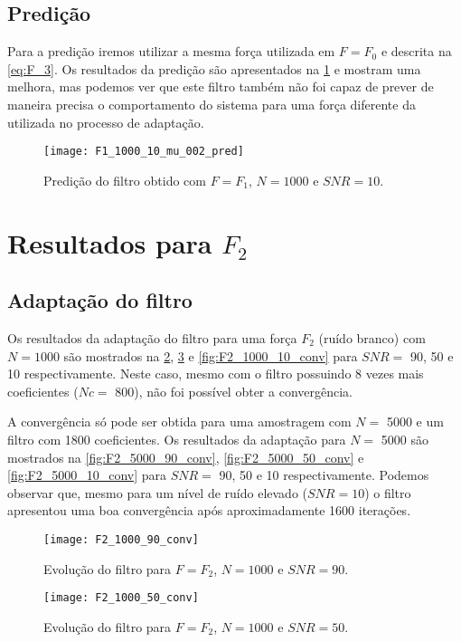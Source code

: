 \subsection{Predição}

Para a predição iremos utilizar a mesma força utilizada em $ F=F_0 $ e descrita na \ref{eq:F_3}. Os resultados da predição são apresentados na \cref{fig:F1_1000_10_mu_002_pred} e mostram uma melhora, mas podemos ver que este filtro também não foi capaz de prever de maneira precisa o comportamento do sistema para uma força diferente da utilizada no processo de adaptação.

\begin{figure}[h]
	\centering
	\texttt{[image: F1\_1000\_10\_mu\_002\_pred]}
	\caption{Predição do filtro obtido com $ F=F_1 $, $ N=1000 $ e $ SNR=10 $.}
	\label{fig:F1_1000_10_mu_002_pred}
\end{figure}

\section{Resultados para $ F_2 $}
\subsection{Adaptação do filtro}

Os resultados da adaptação do filtro para uma força $ F_2 $ (ruído branco) com $ N=1000 $ são mostrados na \cref{fig:F2_1000_90_conv}, \cref{fig:F2_1000_50_conv} e \cref{fig:F2_1000_10_conv} para $ SNR = $ 90, 50 e 10  respectivamente. Neste caso, mesmo com o filtro possuindo 8 vezes mais coeficientes ($ Nc = $ 800), não foi possível obter a convergência.

A convergência só pode ser obtida para uma amostragem com $ N= $ 5000 e um filtro com 1800 coeficientes. Os resultados da adaptação para $ N= $ 5000 são mostrados na \cref{fig:F2_5000_90_conv}, \cref{fig:F2_5000_50_conv} e \cref{fig:F2_5000_10_conv} para $ SNR = $ 90, 50 e 10  respectivamente. Podemos observar que, mesmo para um nível de ruído elevado ($ SNR=10 $) o filtro apresentou uma boa convergência após aproximadamente 1600 iterações.

\begin{figure}
	\centering
	\texttt{[image: F2\_1000\_90\_conv]}
	\caption{Evolução do filtro para $ F=F_2 $, $ N=1000 $ e $ SNR=90 $.}
	\label{fig:F2_1000_90_conv}
\end{figure}

\begin{figure}
	\centering
	\texttt{[image: F2\_1000\_50\_conv]}
	\caption{Evolução do filtro para $ F=F_2 $, $ N=1000 $ e $ SNR=50 $.}
	\label{fig:F2_1000_50_conv}
\end{figure}


